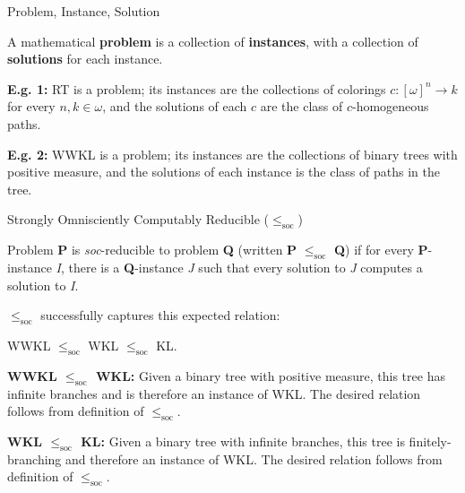 \begin{frame}{Problem, Instance, Solution}
  \vspace{1em}
  \begin{define*}
    A mathematical \textbf{problem} is a collection of \textbf{instances},
    with a collection of \textbf{solutions} for each instance.
  \end{define*}

  \vspace{1em}
  \textbf{E.g. 1:} RT is a problem; its instances are the collections of
  colorings $c:[\omega]^n\rightarrow k$ for every $n,k\in\omega$, and the
  solutions of each $c$ are the class of $c$-homogeneous paths.

  \vspace{1em}
  \textbf{E.g. 2:} WWKL is a problem; its instances are the collections of
  binary trees with positive measure, and the solutions of each instance is
  the class of paths in the tree.
\end{frame}

\begin{frame}{Strongly Omnisciently Computably Reducible
($\leq_{\text{soc}}$)}
  \begin{define*}
    Problem \textbf{P} is \textit{soc}-reducible to problem \textbf{Q}
    (written \textbf{P} $\leq_{\text{soc}}$ \textbf{Q}) if for every
    \textbf{P}-instance \textit{I}, there is a \textbf{Q}-instance
    \textit{J} such that every solution to \textit{J} computes a solution
    to \textit{I}.
  \end{define*}

  $\leq_{\text{soc}}$ successfully captures this expected relation:
  \begin{center}
    WWKL $\leq_{\text{soc}}$ WKL $\leq_{\text{soc}}$ KL.
  \end{center}

  \vspace{0.5em}
  \textbf{WWKL $\leq_{\text{soc}}$ WKL:} Given a binary tree with
  positive measure, this tree has infinite branches and is therefore an
  instance of WKL. The desired relation follows from definition of
  $\leq_{\text{soc}}$.

  \vspace{0.5em}
  \textbf{WKL $\leq_{\text{soc}}$ KL:} Given a binary tree with infinite
  branches, this tree is finitely-branching and therefore an instance of
  WKL. The desired relation follows from definition of $\leq_{\text{soc}}$.
\end{frame}

